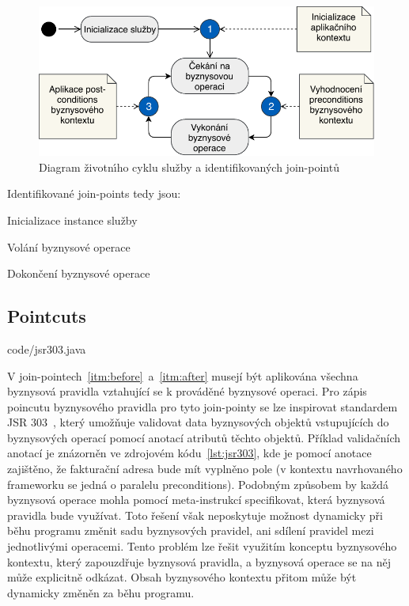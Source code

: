\begin{figure}
    \centering
    \includegraphics[keepaspectratio=true, width=0.6\linewidth]{figures/join-points.pdf}
    \caption{Diagram životn\'{\i}ho cyklu služby a identifikovan\'ych join-pointů}
    \label{fig:join-points}
\end{figure}

Identifikované join-points tedy jsou:

\benum[label=\circledarabic]
\item\label{itm:initialization} Inicializace instance služby
\item\label{itm:before} Volání byznysové operace
\item\label{itm:after} Dokončení byznysové operace
\eenum

\subsection{Pointcuts}


{code/jsr303.java}

V join-pointech~\ref{itm:before}~a~\ref{itm:after} musejí být aplikována všechna byznysová pravidla
vztahující se k prováděné byznysové operaci.
Pro zápis poincutu byznysového pravidla pro tyto join-pointy se lze inspirovat standardem \gls{JSR}
303~\cite{bernard2009jsr}, který umožňuje validovat data byznysových objektů vstupujících do
byznysových operací pomocí anotací atributů těchto objektů. Příklad validačních anotací je znázorněn
ve zdrojovém kódu~\ref{lst:jsr303}, kde je pomocí anotace  zajištěno, že fakturační
adresa bude mít vyplněno pole  (v kontextu navrhovaného frameworku se jedná o paralelu preconditions).
Podobným způsobem by každá byznysová operace mohla pomocí meta-instrukcí specifikovat, která byznysová
pravidla bude využívat. Toto řešení však neposkytuje možnost dynamicky při běhu programu změnit sadu
byznysových pravidel, ani sdílení pravidel mezi jednotlivými operacemi. Tento problém lze řešit využitím
konceptu byznysového kontextu, který zapouzdřuje byznysová pravidla, a byznysová operace se na něj může
explicitně odkázat. Obsah byznysového kontextu přitom může být dynamicky změněn za běhu programu.

